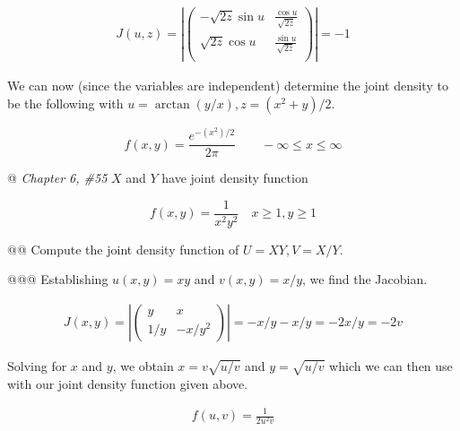 \documentclass[11pt]{article}\usepackage[]{graphicx}\usepackage[]{xcolor}
\begin{document}
\begin{easylist}[enumerate]
    \begin{equation}
        \begin{aligned}
            J(u, z) = \left| \begin{pmatrix}
                                     -\sqrt{2z} \sin u & \frac{\cos u}{\sqrt{2z}}\\
                                     \sqrt{2z} \cos u & \frac{\sin u}{\sqrt{2z}}\\
                                 \end{pmatrix}
                          \right| = -1
        \end{aligned}
    \end{equation}

    We can now (since the variables are independent) determine the joint density to be the following with
    $u=\arctan\left( y/x \right), z=\left( x^2 + y \right)/2$.

    \begin{equation}
        f(x, y) = \frac{e^{-\left( x^2 \right)/2}}{2 \pi} \qquad -\infty \le x \le \infty
    \end{equation}

    @ \textit{Chapter 6, \#55} $X$ and $Y$ have joint density function

    \begin{equation}
        f(x, y) = \frac{1}{x^2y^2} \quad x \ge 1, y \ge 1
    \end{equation}

    @@ Compute the joint density function of $U = XY, V = X/Y$.

    @@@ Establishing $u(x,y)=xy$ and $v(x,y)=x/y$, we find the Jacobian.

    \begin{equation}
        \begin{aligned}
            J(x, y) = \left| \begin{pmatrix}
                                     y & x\\
                                     1/y & -x/y^2
                                 \end{pmatrix}
                          \right| = -x/y - x/y = -2x/y = -2v
        \end{aligned}
    \end{equation}

    Solving for $x$ and $y$, we obtain $x=v\sqrt{u/v}$ and $y=\sqrt{u/v}$ which we can then use with our joint density
    function given above.

    \begin{equation}
        \begin{aligned}
            f(u, v) = \frac{1}{2u^2v}
        \end{aligned}
    \end{equation}


\end{easylist}
\end{document}
